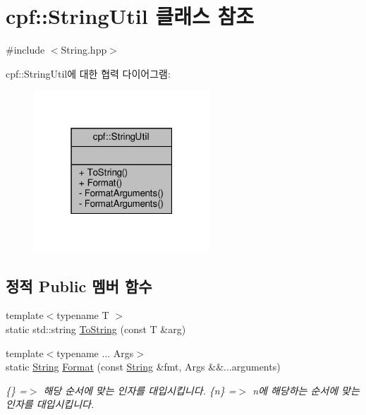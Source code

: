 \hypertarget{classcpf_1_1_string_util}{}\section{cpf\+:\+:String\+Util 클래스 참조}
\label{classcpf_1_1_string_util}


{\ttfamily \#include $<$String.\+hpp$>$}



cpf\+:\+:String\+Util에 대한 협력 다이어그램\+:\nopagebreak
\begin{figure}[H]
\begin{center}
\leavevmode
\includegraphics[width=187pt]{classcpf_1_1_string_util__coll__graph}
\end{center}
\end{figure}
\subsection*{정적 Public 멤버 함수}
\begin{DoxyCompactItemize}
\item 
{\footnotesize template$<$typename T $>$ }\\static std\+::string \hyperlink{classcpf_1_1_string_util_a53a8571bef952fecc7008f309171b8c5}{To\+String} (const T \&arg)
\item 
{\footnotesize template$<$typename ... Args$>$ }\\static \hyperlink{namespacecpf_a4dbd6992c3ed4440ce7ed8982ff7ffea}{String} \hyperlink{classcpf_1_1_string_util_a965cca44ea396f01f2f3c5e3851f1001}{Format} (const \hyperlink{namespacecpf_a4dbd6992c3ed4440ce7ed8982ff7ffea}{String} \&fmt, Args \&\&...arguments)
\begin{DoxyCompactList}\small\item\em \{\} =$>$ 해당 순서에 맞는 인자를 대입시킵니다. \{n\} =$>$ n에 해당하는 순서에 맞는 인자를 대입시킵니다. \end{DoxyCompactList}\end{DoxyCompactItemize}
